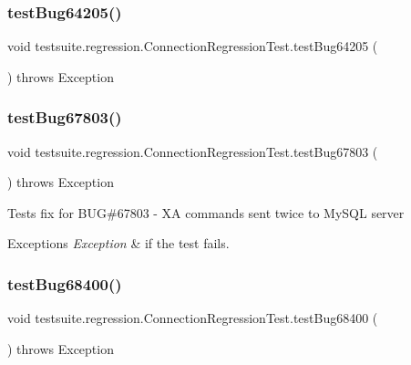 \subsubsection{\texorpdfstring{test\+Bug64205()}{testBug64205()}}
{\footnotesize\ttfamily void testsuite.\+regression.\+Connection\+Regression\+Test.\+test\+Bug64205 (\begin{DoxyParamCaption}{ }\end{DoxyParamCaption}) throws Exception}

\mbox{\label{classtestsuite_1_1regression_1_1_connection_regression_test_a4ac113ac44c3a4432d84e3a3c062da8f}} 
\subsubsection{\texorpdfstring{test\+Bug67803()}{testBug67803()}}
{\footnotesize\ttfamily void testsuite.\+regression.\+Connection\+Regression\+Test.\+test\+Bug67803 (\begin{DoxyParamCaption}{ }\end{DoxyParamCaption}) throws Exception}

Tests fix for B\+UG\#67803 -\/ XA commands sent twice to My\+S\+QL server


\begin{DoxyExceptions}{Exceptions}
{\em Exception} & if the test fails. \\
\hline
\end{DoxyExceptions}
\mbox{\label{classtestsuite_1_1regression_1_1_connection_regression_test_a51c24689dc4bef4ba615be9fc98cf30a}} 
\subsubsection{\texorpdfstring{test\+Bug68400()}{testBug68400()}}
{\footnotesize\ttfamily void testsuite.\+regression.\+Connection\+Regression\+Test.\+test\+Bug68400 (\begin{DoxyParamCaption}{ }\end{DoxyParamCaption}) throws Exception}

